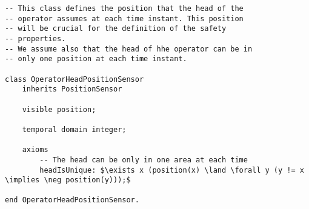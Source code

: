 \begin{lstlisting}[fontadjust, mathescape, frame=single] 
-- This class defines the position that the head of the
-- operator assumes at each time instant. This position
-- will be crucial for the definition of the safety 
-- properties. 
-- We assume also that the head of hhe operator can be in
-- only one position at each time instant.

class OperatorHeadPositionSensor
    inherits PositionSensor
    
    visible position;

    temporal domain integer;

    axioms
        -- The head can be only in one area at each time
        headIsUnique: $\exists x (position(x) \land \forall y (y != x \implies \neg position(y)));$

end OperatorHeadPositionSensor.
\end{lstlisting}